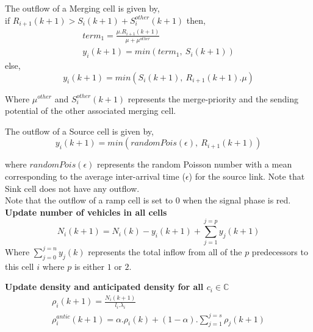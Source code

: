 \documentclass{wscpaperproc}
\theoremstyle{wsc}
\begin{document}
The outflow of a Merging cell is given by,\\
if $R_{i+1}(k+1)>S_i(k+1)+S_i^{other}(k+1)$ then,
\begin{subequations} 
 \label{eq:merging-outflow}
 \begin{eqnarray}
 term_1=\frac{\mu.R_{i+1}(k+1)}{\mu+\mu^{other}}\\
 y_i(k+1)=min(term_1,~S_i(k+1))
 \end{eqnarray}
 \end{subequations}
 else,
\begin{equation}
 y_i(k+1)=min(S_i(k+1),~R_{i+1}(k+1).\mu)
 \end{equation}

Where $\mu^{other}$ and $S_i^{other}(k+1)$ represents the merge-priority and the sending potential of the other associated merging cell.

The outflow of a Source cell is given by,\\
\begin{equation}
y_i(k+1)=min(randomPois(\epsilon),~R_{i+1}(k+1))
\end{equation}

where $randomPois(\epsilon)$ represents the random Poisson number with a mean corresponding to the average inter-arrival time ($\epsilon$) for the source link. Note that Sink cell does not have any outflow.\\
Note that the outflow of a ramp cell is set to $0$ when the signal phase is red.\\

\textbf{Update number of vehicles in all cells}\\
\begin{equation}
N_i(k+1)=N_i(k)-y_i(k+1)+\sum\limits_{j=1}^{j=p}y_j(k+1)
\end{equation}
Where $\sum\limits_{j=0}^{j=n}y_j(k)$ represents the total inflow from all of the $p$ predecessors to this cell $i$ where $p$ is either $1$ or $2$.


\textbf{Update density and anticipated density for all $c_i\in \mathbb{C}$}\\
\begin{subequations}
 \label{eq:cell-density}
 \begin{eqnarray}
\rho_i(k+1)=\frac{N_i(k+1)}{l_i.\lambda_i}\\
\rho_i^{antic}(k+1)=\alpha.\rho_i(k)+(1-\alpha).\sum\limits_{j=1}^{j=s}\rho_j(k+1)
\end{eqnarray}
\end{subequations}
\end{document}
